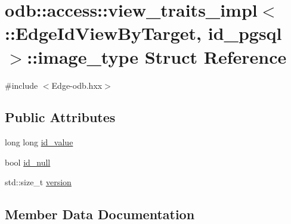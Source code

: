 \hypertarget{structodb_1_1access_1_1view__traits__impl_3_01_1_1_edge_id_view_by_target_00_01id__pgsql_01_4_1_1image__type}{}\section{odb\+:\+:access\+:\+:view\+\_\+traits\+\_\+impl$<$ \+:\+:Edge\+Id\+View\+By\+Target, id\+\_\+pgsql $>$\+:\+:image\+\_\+type Struct Reference}
\label{structodb_1_1access_1_1view__traits__impl_3_01_1_1_edge_id_view_by_target_00_01id__pgsql_01_4_1_1image__type}


{\ttfamily \#include $<$Edge-\/odb.\+hxx$>$}

\subsection*{Public Attributes}
\begin{DoxyCompactItemize}
\item 
long long \hyperlink{structodb_1_1access_1_1view__traits__impl_3_01_1_1_edge_id_view_by_target_00_01id__pgsql_01_4_1_1image__type_a31acb9194dbdef47eca49ca30a4efbc6}{id\+\_\+value}
\item 
bool \hyperlink{structodb_1_1access_1_1view__traits__impl_3_01_1_1_edge_id_view_by_target_00_01id__pgsql_01_4_1_1image__type_a6764e7d11ee80834fea94dd7e7105c58}{id\+\_\+null}
\item 
std\+::size\+\_\+t \hyperlink{structodb_1_1access_1_1view__traits__impl_3_01_1_1_edge_id_view_by_target_00_01id__pgsql_01_4_1_1image__type_a5972b53d9e6f62e0619d54b5e5aa2b3a}{version}
\end{DoxyCompactItemize}


\subsection{Member Data Documentation}
\hypertarget{structodb_1_1access_1_1view__traits__impl_3_01_1_1_edge_id_view_by_target_00_01id__pgsql_01_4_1_1image__type_a6764e7d11ee80834fea94dd7e7105c58}{}
